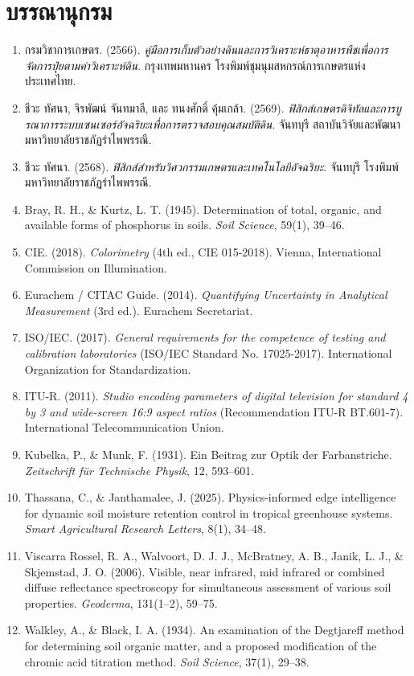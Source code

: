 \chapter*{บรรณานุกรม}

\begin{enumerate}[leftmargin=1.5em, itemsep=6pt]
    \item กรมวิชาการเกษตร. (2566). \textit{คู่มือการเก็บตัวอย่างดินและการวิเคราะห์ธาตุอาหารพืชเพื่อการจัดการปุ๋ยตามค่าวิเคราะห์ดิน}. กรุงเทพมหานคร โรงพิมพ์ชุมนุมสหกรณ์การเกษตรแห่งประเทศไทย.
    \item ชีวะ ทัศนา, จิรพัฒน์ จันทมาลี, และ ทนงศักดิ์ คุ้มเกล้า. (2569). \textit{ฟิสิกส์เกษตรดิจิทัลและการบูรณาการระบบเซนเซอร์อัจฉริยะเพื่อการตรวจสอบคุณสมบัติดิน}. จันทบุรี สถาบันวิจัยและพัฒนา มหาวิทยาลัยราชภัฏรำไพพรรณี.
    \item ชีวะ ทัศนา. (2568). \textit{ฟิสิกส์สำหรับวิศวกรรมเกษตรและเทคโนโลยีอัจฉริยะ}. จันทบุรี โรงพิมพ์มหาวิทยาลัยราชภัฏรำไพพรรณี.
    \item Bray, R. H., \& Kurtz, L. T. (1945). Determination of total, organic, and available forms of phosphorus in soils. \textit{Soil Science}, 59(1), 39--46.
    \item CIE. (2018). \textit{Colorimetry} (4th ed., CIE 015-2018). Vienna, International Commission on Illumination.
    \item Eurachem / CITAC Guide. (2014). \textit{Quantifying Uncertainty in Analytical Measurement} (3rd ed.). Eurachem Secretariat.
    \item ISO/IEC. (2017). \textit{General requirements for the competence of testing and calibration laboratories} (ISO/IEC Standard No. 17025-2017). International Organization for Standardization.
    \item ITU-R. (2011). \textit{Studio encoding parameters of digital television for standard 4 by 3 and wide-screen 16:9 aspect ratios} (Recommendation ITU-R BT.601-7). International Telecommunication Union.
    \item Kubelka, P., \& Munk, F. (1931). Ein Beitrag zur Optik der Farbanstriche. \textit{Zeitschrift für Technische Physik}, 12, 593--601.
    \item Thassana, C., \& Janthamalee, J. (2025). Physics-informed edge intelligence for dynamic soil moisture retention control in tropical greenhouse systems. \textit{Smart Agricultural Research Letters}, 8(1), 34--48.
    \item Viscarra Rossel, R. A., Walvoort, D. J. J., McBratney, A. B., Janik, L. J., \& Skjemstad, J. O. (2006). Visible, near infrared, mid infrared or combined diffuse reflectance spectroscopy for simultaneous assessment of various soil properties. \textit{Geoderma}, 131(1--2), 59--75.
    \item Walkley, A., \& Black, I. A. (1934). An examination of the Degtjareff method for determining soil organic matter, and a proposed modification of the chromic acid titration method. \textit{Soil Science}, 37(1), 29--38.
\end{enumerate}
\cleardoublepage
